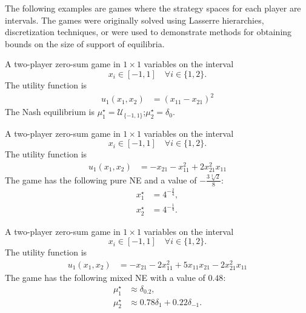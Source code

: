 


The following examples are games where the strategy spaces for each player are intervals. The games were originally solved using Lasserre hierarchies, discretization techniques, or were used to demonstrate methods for obtaining bounds on the size of support of equilibria.

\begin{game}\label{ex.parrilo06.2.1}
A two-player zero-sum game in $1 \times 1$ variables on the interval
\[
x_i \in [-1,1] \quad \forall i \in \{1,2\}.
\]
The utility function is \cite[Example~2.1]{parrilo:polynomial}
\begin{align*}
u_{1}\left( x_{1}, x_{2} \right) &= \left( x_{11} - x_{21} \right)^{2}
\end{align*}
The Nash equilibrium is $\mu_1^\star = \mathcal{U}_{\{-1,1\}}$;\;$\mu_2^\star = \delta_{0}$.
\end{game}

\begin{game}\label{ex.parrilo06.3.1}
A two-player zero-sum game in $1 \times 1$ variables on the interval
\[
x_i \in [-1,1] \quad \forall i \in \{1,2\}.
\]
The utility function is \cite[Example~3.1]{parrilo:polynomial}
\begin{align*}
u_{1}\left( x_{1}, x_{2} \right) &=  - x_{21} - x_{11}^{2} + 2 x_{21}^{2} x_{11}
\end{align*}
The game has the following pure NE and a value of $-\frac{3 \sqrt[3]{2}}{8}$:
\begin{align*}
    x_1^\star &= 4^{-\frac{2}{4}},\\
    x_2^\star &= 4^{-\frac{1}{4}}.
\end{align*}
\end{game}

\begin{game}\label{ex.parrilo06.3.2}
A two-player zero-sum game in $1 \times 1$ variables on the interval
\[
x_i \in [-1,1] \quad \forall i \in \{1,2\}.
\]
The utility function is \cite[Example~3.2]{parrilo:polynomial}
\begin{align*}
u_{1}\left( x_{1}, x_{2} \right) &=  - x_{21} - 2 x_{11}^{2} + 5 x_{11} x_{21} - 2 x_{21}^{2} x_{11}
\end{align*}
The game has the following mixed NE with a value of $0.48$:
\begin{align*}
\mu_1^\star &\approx \delta_{0.2},\\
\mu_2^\star &\approx 0.78\delta_{1} + 0.22\delta_{-1}.
\end{align*}
\end{game}

